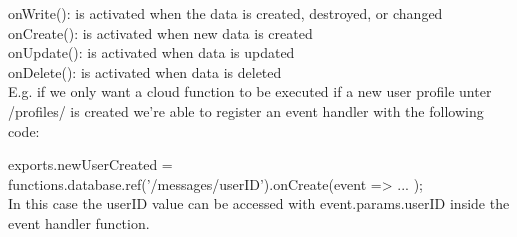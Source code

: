onWrite(): is activated when the data is created, destroyed, or changed\\
onCreate(): is activated when new data is created\\
onUpdate(): is activated when data is updated\\
onDelete(): is activated when data is deleted\\
E.g. if we only want a cloud function to be executed if a new user profile unter /profiles/ is created we’re able to register an event handler with the following code:

exports.newUserCreated = functions.database.ref('/messages/{userID}').onCreate(event => { ... });\\
In this case the userID value can be accessed with event.params.userID inside the event handler function.

